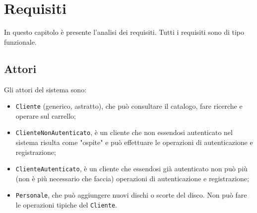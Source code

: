 \chapter{Requisiti}

\newlength{\reqdesc}
\setlength{\reqdesc}{\textwidth-5cm}

\NewDocumentCommand{}

In questo capitolo è presente l'analisi dei requisiti. Tutti i requisiti sono di tipo funzionale.

\section{Attori}

Gli attori del sistema sono:
\begin{itemize}
    \item \texttt{Cliente} (generico, astratto), che può consultare il catalogo, fare ricerche e operare sul carrello;
    \item \texttt{ClienteNonAutenticato}, è un \gls{cliente} che non essendosi autenticato nel sistema risulta come "ospite" e può effettuare le operazioni di autenticazione e registrazione;
    \item \texttt{ClienteAutenticato}, è un cliente che essendosi già autenticato non può più (non è più necessario che faccia) operazioni di autenticazione e registrazione;
    \item \texttt{Personale}, che può aggiungere nuovi dischi o scorte del disco. Non può fare le operazioni tipiche del \texttt{Cliente}.
\end{itemize}

